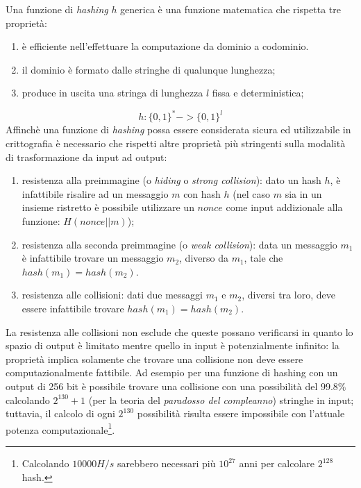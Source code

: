 Una funzione di \textit{hashing} $h$ generica è una funzione matematica che rispetta tre proprietà:

\begin{enumerate}
    \item è efficiente nell'effettuare la computazione da dominio a codominio.
    \item il dominio è formato dalle stringhe di qualunque lunghezza;
    \item produce in uscita una stringa di lunghezza $l$ fissa e deterministica;
\end{enumerate}
\begin{equation}
    h: \{0,1\}^* -> \{0,1\}^l
\end{equation}
Affinchè una funzione di \textit{hashing} possa essere considerata sicura ed utilizzabile in crittografia è necessario che rispetti altre proprietà più stringenti sulla modalità di trasformazione da input ad output:

\begin{enumerate}
    \item resistenza alla preimmagine (o \textit{hiding} o \textit{strong collision}): dato un hash $h$, è infattibile risalire ad un messaggio $m$ con hash $h$ (nel caso $m$ sia in un insieme ristretto è possibile utilizzare un $nonce$ come input addizionale alla funzione: $H(nonce || m)$);
    \item resistenza alla seconda preimmagine (o \textit{weak collision}): data un messaggio $m_1$ è infattibile trovare un messaggio $m_2$, diverso da $m_1$, tale che $hash(m_1)=hash(m_2)$.
    \item resistenza alle collisioni: dati due messaggi $m_1$ e $m_2$, diversi tra loro, deve essere infattibile trovare $hash(m_1)=hash(m_2)$.
\end{enumerate}
La resistenza alle collisioni non esclude che queste possano verificarsi in quanto lo spazio di output è limitato mentre quello in input è potenzialmente infinito: la proprietà implica solamente che trovare una collisione non deve essere computazionalmente fattibile. Ad esempio per una funzione di hashing con un output di 256 bit è possibile trovare una collisione con una possibilità del $99.8\%$ calcolando $2^{130}+1$ (per la teoria del \textit{paradosso del compleanno}) stringhe in input; tuttavia, il calcolo di ogni $2^{130}$ possibilità risulta essere impossibile con l'attuale potenza computazionale\footnote{Calcolando $10 000 H/s$ sarebbero necessari più $10^{27}$ anni per calcolare $2^{128}$ hash.}.


